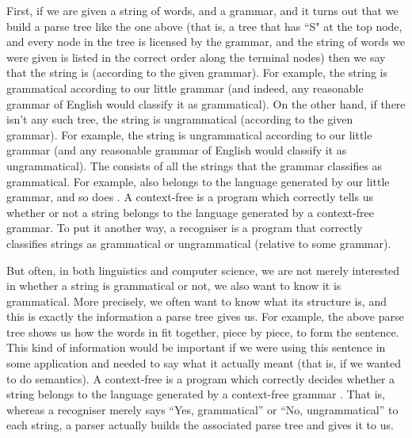First, if we are given a string of words, and a grammar, and it turns
out that we  build a parse tree like the one above (that is, a
tree that has ``S" at the top node, and every node in the tree is
licensed by the grammar, and the string of words we were given is
listed in the correct order along the terminal nodes) then we say that
the string is  (according to the given grammar).  For
example, the string  is grammatical according
to our little grammar (and indeed, any reasonable grammar of English
would classify it as grammatical). On the other hand, if there isn't
any such tree, the string is ungrammatical (according to the
given grammar). For example, the string  is ungrammatical according to our little grammar (and any
reasonable grammar of English would classify it as ungrammatical).
The  consists of all the strings
that the grammar classifies as grammatical.  For example,  also belongs to the language generated by our little
grammar, and so does . A context-free
 is a program which correctly tells us whether or not a
string belongs to the language generated by a context-free grammar.
To put it another way, a recogniser is a program that correctly classifies strings
as grammatical or ungrammatical (relative to some grammar).

But often, in both linguistics and computer science, we are not merely
interested in whether a string is grammatical or not, we also want to
know  it is grammatical.  More precisely, we often want
to know what its structure is, and this is exactly the information a
parse tree gives us. For example, the above parse tree shows us how
the words in  fit together, piece by
piece, to form the sentence.  This kind of information would be
important if we were using this sentence in some application and
needed to say what it actually meant (that is, if we wanted to do
semantics). A context-free  is a program which
correctly decides whether a string belongs to the language generated
by a context-free grammar .  That is, whereas a recogniser merely says ``Yes,
grammatical'' or ``No, ungrammatical'' to each string, a parser actually
builds the associated parse tree and gives it to us.

